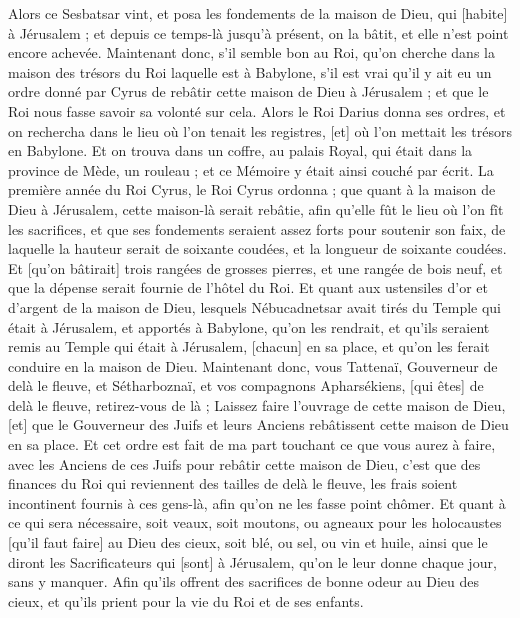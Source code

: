 \begin{multicols}{2}
Alors ce Sesbatsar vint, et posa les fondements de la maison de Dieu, qui [habite] à Jérusalem ; et depuis ce temps-là jusqu'à présent, on la bâtit, et elle n'est point encore achevée.
Maintenant donc, s'il semble bon au Roi, qu'on cherche dans la maison des trésors du Roi laquelle est à Babylone, s'il est vrai qu'il y ait eu un ordre donné par Cyrus de rebâtir cette maison de Dieu à Jérusalem ; et que le Roi nous fasse savoir sa volonté sur cela.
\VerseOne{}Alors le Roi Darius donna ses ordres, et on rechercha dans le lieu où l'on tenait les registres, [et] où l'on mettait les trésors en Babylone.
Et on trouva dans un coffre, au palais Royal, qui était dans la province de Mède, un rouleau ; et ce Mémoire y était ainsi couché par écrit.
La première année du Roi Cyrus, le Roi Cyrus ordonna ; que quant à la maison de Dieu à Jérusalem, cette maison-là serait rebâtie, afin qu'elle fût le lieu où l'on fît les sacrifices, et que ses fondements seraient assez forts pour soutenir son faix, de laquelle la hauteur serait de soixante coudées, et la longueur de soixante coudées.
Et [qu'on bâtirait] trois rangées de grosses pierres, et une rangée de bois neuf, et que la dépense serait fournie de l'hôtel du Roi.
Et quant aux ustensiles d'or et d'argent de la maison de Dieu, lesquels Nébucadnetsar avait tirés du Temple qui était à Jérusalem, et apportés à Babylone, qu'on les rendrait, et qu'ils seraient remis au Temple qui était à Jérusalem, [chacun] en sa place, et qu'on les ferait conduire en la maison de Dieu.
Maintenant donc, vous Tattenaï, Gouverneur de delà le fleuve, et Sétharboznaï, et vos compagnons Apharsékiens, [qui êtes] de delà le fleuve, retirez-vous de là ;
Laissez faire l'ouvrage de cette maison de Dieu, [et] que le Gouverneur des Juifs et leurs Anciens rebâtissent cette maison de Dieu en sa place.
Et cet ordre est fait de ma part touchant ce que vous aurez à faire, avec les Anciens de ces Juifs pour rebâtir cette maison de Dieu, c'est que des finances du Roi qui reviennent des tailles de delà le fleuve, les frais soient incontinent fournis à ces gens-là, afin qu'on ne les fasse point chômer.
Et quant à ce qui sera nécessaire, soit veaux, soit moutons, ou agneaux pour les holocaustes [qu'il faut faire] au Dieu des cieux, soit blé, ou sel, ou vin et huile, ainsi que le diront les Sacrificateurs qui [sont] à Jérusalem, qu'on le leur donne chaque jour, sans y manquer.
Afin qu'ils offrent des sacrifices de bonne odeur au Dieu des cieux, et qu'ils prient pour la vie du Roi et de ses enfants.

\end{multicols}
